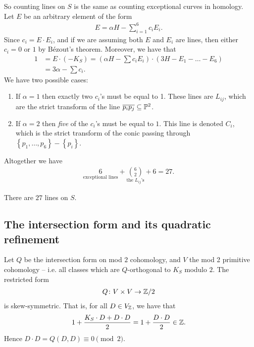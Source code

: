\documentclass[11pt]{amsart}
\begin{document}
So counting lines on $S$ is the same as counting exceptional curves in homology. Let $E$ be an arbitrary element of the form
\begin{align*}
    E = \alpha H - \sum_{i=1}^6 c_i E_i.
\end{align*}
Since $c_i = E\cdot E_i$, and if we are assuming both $E$ and $E_i$ are lines, then either $c_i = 0$ or $1$ by B\'{e}zout's theorem. Moreover, we have that
\begin{align*}
    1 &= E\cdot (-K_S) = \left( \alpha H - \sum c_i E_i \right)\cdot (3H - E_1 - \ldots - E_6) \\
    &= 3\alpha - \sum c_i.
\end{align*}
We have two possible cases:
\begin{enumerate}
    \item If $\alpha = 1$ then exactly two $c_i$'s must be equal to 1. These lines are $L_{ij}$, which are the strict transform of the line $\overline{p_i p_j} \subseteq \P^2$.
    \item If $\alpha = 2$ then \textit{five} of the $c_i$'s must be equal to $1$. This line is denoted $C_i$, which is the strict transform of the conic passing through $\left\{ p_1, \ldots, p_6 \right\}\minus \left\{ p_i \right\}$.
\end{enumerate}
Altogether we have
\begin{align*}
    \underset{\text{exceptional lines}}{6} + \underset{\text{the }L_{ij}\text{'s}}{\binom{6}{2}} + 6 = 27.
\end{align*}
%
\begin{theorem} There are $27$ lines on $S$.
\end{theorem}

\subsection{The intersection form and its quadratic refinement}

Let $Q$ be the intersection form on mod $2$ cohomology, and $V$ the mod 2 primitive cohomology -- i.e. all classes which are $Q$-orthogonal to $K_S$ modulo $2$. The restricted form
\begin{align*}
    Q \colon V \times V \to \Z/2
\end{align*}
is skew-symmetric. That is, for all $D \in V_\Z$, we have that
\begin{align*}
    1 + \frac{K_S\cdot D + D\cdot D}{ 2 } = 1 + \frac{D\cdot D}{2} \in \Z.
\end{align*}
Hence $D \cdot D = Q(D,D) \equiv 0 \pmod{2}$.
\end{document}

